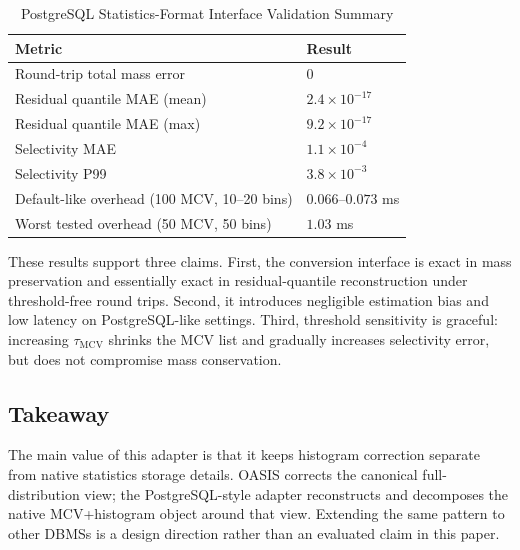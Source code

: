 \begin{table}[h]
\centering
\caption{PostgreSQL Statistics-Format Interface Validation Summary}
\label{tab:mcv-validation-summary}
\begin{tabular}{l l}
\toprule
\textbf{Metric} & \textbf{Result} \\
\midrule
Round-trip total mass error & $0$ \\
Residual quantile MAE (mean) & $2.4 \times 10^{-17}$ \\
Residual quantile MAE (max) & $9.2 \times 10^{-17}$ \\
Selectivity MAE & $1.1 \times 10^{-4}$ \\
Selectivity P99 & $3.8 \times 10^{-3}$ \\
Default-like overhead (100 MCV, 10--20 bins) & $0.066$--$0.073$ ms \\
Worst tested overhead (50 MCV, 50 bins) & $1.03$ ms \\
\bottomrule
\end{tabular}
\end{table}

These results support three claims. First, the conversion interface is exact in
mass preservation and essentially exact in residual-quantile reconstruction
under threshold-free round trips. Second, it introduces negligible estimation
bias and low latency on PostgreSQL-like settings. Third, threshold sensitivity
is graceful: increasing $\tau_{\text{MCV}}$ shrinks the MCV list and gradually
increases selectivity error, but does not compromise mass conservation.

\subsection{Takeaway}

The main value of this adapter is that it keeps histogram correction separate
from native statistics storage details. OASIS corrects the canonical
full-distribution view; the PostgreSQL-style adapter reconstructs and
decomposes the native MCV+histogram object around that view. Extending the same
pattern to other DBMSs is a design direction rather than an evaluated claim in
this paper.
